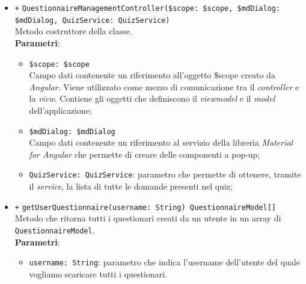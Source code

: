 \begin{itemize}
	\begin{itemize}
		\item \texttt{+} \texttt{QuestionnaireManagementController(\$scope: \$scope, \$mdDialog: \$mdDialog, QuizService: QuizService)} \\Metodo costruttore della classe.\\
		\textbf{Parametri}: 
		\begin{itemize}
			\item \texttt{\$scope: \$scope} \\
			Campo dati contenente un riferimento all'oggetto \$scope creato da \textit{Angular}. Viene utilizzato come mezzo di comunicazione tra il \textit{controller} e la \textit{view}. Contiene gli oggetti che definiscono il \textit{viewmodel} e il \textit{model} dell'applicazione;
			\item \texttt{\$mdDialog: \$mdDialog} \\
			Campo dati contenente un riferimento al servizio della libreria \textit{Material for Angular} che permette di creare delle componenti a pop-up;
			\item \texttt{QuizService: QuizService}: parametro che permette di ottenere, tramite il \textit{service}, la lista di tutte le domande presenti nel quiz;
		\end{itemize}
		\item \texttt{+} \texttt{getUserQuestionnaire(username: String) QuestionnaireModel[]} \\Metodo che ritorna tutti i questionari creati da un utente in un array di \texttt{QuestionnaireModel}. \\
		\textbf{Parametri}:
		\begin{itemize}
			\item \texttt{username: String}: parametro che indica l'username dell'utente del quale vogliamo scaricare tutti i questionari.
		\end{itemize}
	\end{itemize}
\end{itemize}


